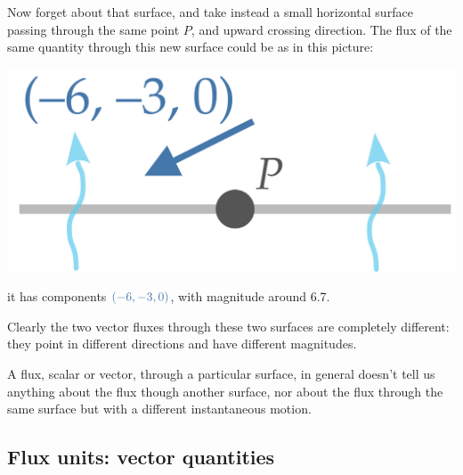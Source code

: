 \documentclass[a4paper,12pt,%
onecolumn,oneside,%
british%
]{memoir}
\providecommand{\href}[2]{#2}
\renewcommand*{\|}[1][]{\nonscript\:#1\vert\nonscript\:\mathopen{}}
\newcommand*{\furl}[2]{\href{#1}{#2}\pagenote{\url{#1}}}
\begin{document}
Now forget about that surface, and take instead a small horizontal surface passing through the same point $P$, and upward crossing direction. The flux of the same quantity through this new surface could be as in this picture:
\begin{center}
  \includegraphics[align=c,scale=0.08]{images/skewfluxPy.pdf}
\end{center}
it has components $\mathcolor{blue}{(-6,-3,0)}$, with magnitude around \num{6.7}.

Clearly the two vector fluxes through these two surfaces are completely different: they point in different directions and have different magnitudes.

\begin{warning}
  A flux, scalar or vector, through a particular surface, in general doesn't tell us anything about the flux though another surface, nor about the flux through the same surface but with a different instantaneous motion.
\end{warning}

\subsection{Flux units: vector quantities}
\end{document}
